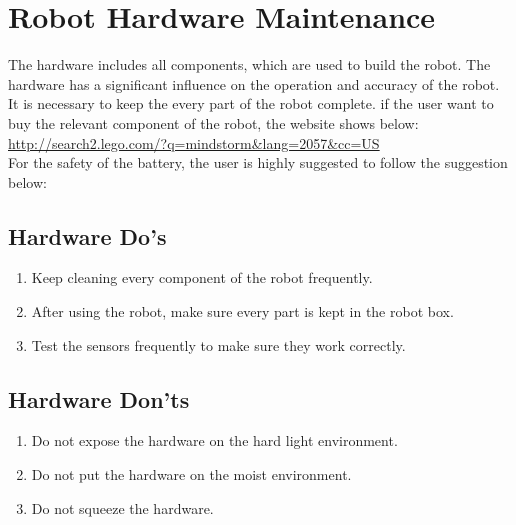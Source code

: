 \documentclass[11pt, a4paper]{report}
\begin{document}
\section{Robot Hardware Maintenance} %
\label{sec:robot_hardware_maintenance}
The hardware includes all components, which are used to build the robot. The hardware has a significant influence on the operation and accuracy of the robot. It is necessary to keep the every part of the robot complete. if the user want to buy the relevant component of the robot, the website shows below:\\ 
\url{http://search2.lego.com/?q=mindstorm&lang=2057&cc=US} \\ 
For the safety of the battery, the user is highly suggested to follow the suggestion below:
\subsection{Hardware Do's}
\begin{enumerate}
\item Keep cleaning every component of the robot frequently.
\item After using the robot, make sure every part is kept in the robot box.
\item Test the sensors frequently to make sure they work correctly.
\end{enumerate}
\subsection{Hardware Don'ts}
\begin{enumerate}
\item Do not expose the hardware on the hard light environment.
\item Do not put the hardware on the moist environment.
\item Do not squeeze the hardware.
\end{enumerate}











\end{document}
